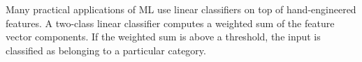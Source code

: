 \documentclass[10pts]{article}
\begin{document}
Many practical applications of ML use linear classifiers on top of
hand-engineered features. A two-class linear classifier computes a
weighted sum of the feature vector components. If the weighted sum is
above a threshold, the input is classified as belonging to a
particular category. %
\end{document}
